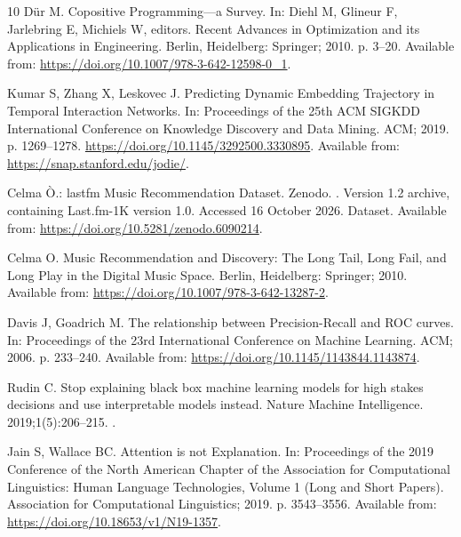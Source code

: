 \documentclass[pdflatex,sn-vancouver-num]{sn-jnl}
\theoremstyle{thmstyleone}
\begin{document}
\begin{thebibliography}{10}
D{\"u}r M.
\newblock Copositive Programming---a Survey.
\newblock In: Diehl M, Glineur F, Jarlebring E, Michiels W, editors. Recent
  Advances in Optimization and its Applications in Engineering. Berlin,
  Heidelberg: Springer; 2010. p. 3--20.
\newblock Available from: \url{https://doi.org/10.1007/978-3-642-12598-0_1}.

Kumar S, Zhang X, Leskovec J.
\newblock Predicting Dynamic Embedding Trajectory in Temporal Interaction
  Networks.
\newblock In: Proceedings of the 25th ACM SIGKDD International Conference on
  Knowledge Discovery and Data Mining. ACM; 2019. p. 1269--1278.
\newblock \url{https://doi.org/10.1145/3292500.3330895}.
\newblock Available from: \url{https://snap.stanford.edu/jodie/}.

Celma {\`O}.: lastfm Music Recommendation Dataset.
\newblock Zenodo.
. Version 1.2 archive, containing Last.fm-1K version 1.0.
  Accessed 16 October 2026.
\newblock Dataset.
\newblock Available from: \url{https://doi.org/10.5281/zenodo.6090214}.

Celma O.
\newblock Music Recommendation and Discovery: The Long Tail, Long Fail, and
  Long Play in the Digital Music Space.
\newblock Berlin, Heidelberg: Springer; 2010.
\newblock Available from: \url{https://doi.org/10.1007/978-3-642-13287-2}.

Davis J, Goadrich M.
\newblock The relationship between {Precision-Recall} and {ROC} curves.
\newblock In: Proceedings of the 23rd International Conference on Machine
  Learning. ACM; 2006. p. 233--240.
\newblock Available from: \url{https://doi.org/10.1145/1143844.1143874}.

Rudin C.
\newblock Stop explaining black box machine learning models for high stakes
  decisions and use interpretable models instead.
\newblock Nature Machine Intelligence. 2019;1(5):206--215.
\newblock {}.

Jain S, Wallace BC.
\newblock Attention is not Explanation.
\newblock In: Proceedings of the 2019 Conference of the North American Chapter
  of the Association for Computational Linguistics: Human Language
  Technologies, Volume 1 (Long and Short Papers). Association for Computational
  Linguistics; 2019. p. 3543--3556.
\newblock Available from: \url{https://doi.org/10.18653/v1/N19-1357}.


\end{thebibliography}
\end{document}
